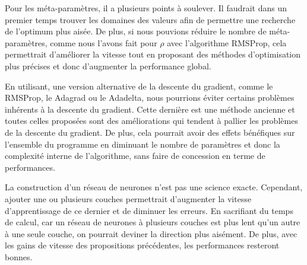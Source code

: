 \documentclass[a4paper, 11pt]{article}
\begin{document}
Pour les méta-paramètres, il a plusieurs points à soulever. Il faudrait dans un premier temps trouver les domaines des valeurs afin de permettre
une recherche de l'optimum plus aisée. De plus, si nous pouvions réduire le nombre de méta-paramètres, comme nous l'avons fait pour $\rho$ avec l'algorithme
RMSProp, cela permettrait d'améliorer la vitesse tout en proposant des méthodes d'optimisation plus précises et donc d'augmenter la performance global.

En utilisant, une version alternative de la descente du gradient, comme le RMSProp, le Adagrad ou le Adadelta, nous pourrions éviter certains problèmes
inhérents à la descente du gradient. Cette dernière est une méthode ancienne et toutes celles proposées sont des améliorations qui tendent à pallier les
problèmes de la descente du gradient. De plus, cela pourrait avoir des effets bénéfiques sur l'ensemble du programme en diminuant le nombre de paramètres
et donc la complexité interne de l'algorithme, sans faire de concession en terme de performances.

La construction d'un réseau de neurones n'est pas une science exacte. Cependant, ajouter une ou plusieurs couches permettrait d'augmenter la 
vitesse d'apprentissage de ce dernier et de diminuer les erreurs. En sacrifiant du temps de calcul, car un réseau de neurones à plusieurs couches est plus
lent qu'un autre à une seule couche, on pourrait deviner la direction plus aisément. De plus, avec les gains de vitesse des propositions précédentes, les
performances resteront bonnes.

\newpage

\nocite{*}

\end{document}
